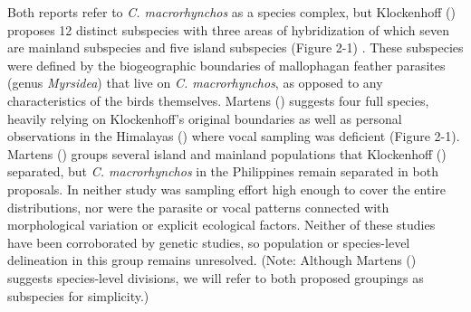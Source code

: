 \documentclass[10pt,a4paper]{article}
\begin{document}
Both reports refer to \emph{C. macrorhynchos} as a species complex, but Klockenhoff () proposes 12 distinct subspecies with three areas of hybridization of which seven are mainland subspecies and five island subspecies (Figure 2-1) .
These subspecies were defined by the biogeographic boundaries of mallophagan feather parasites (genus \emph{Myrsidea}) that live on \emph{C. macrorhynchos}, as opposed to any characteristics of the birds themselves.
Martens () suggests four full species, heavily relying on Klockenhoff's original boundaries as well as personal observations in the Himalayas () where vocal sampling was deficient (Figure 2-1).
Martens () groups several island and mainland populations that Klockenhoff () separated, but \emph{C. macrorhynchos} in the Philippines remain separated in both proposals.
In neither study was sampling effort high enough to cover the entire distributions, nor were the parasite or vocal patterns connected with morphological variation or explicit ecological factors.
Neither of these studies have been corroborated by genetic studies, so population or species-level delineation in this group remains unresolved.
(Note: Although Martens () suggests species-level divisions, we will refer to both proposed groupings as subspecies for simplicity.)
\end{document}
